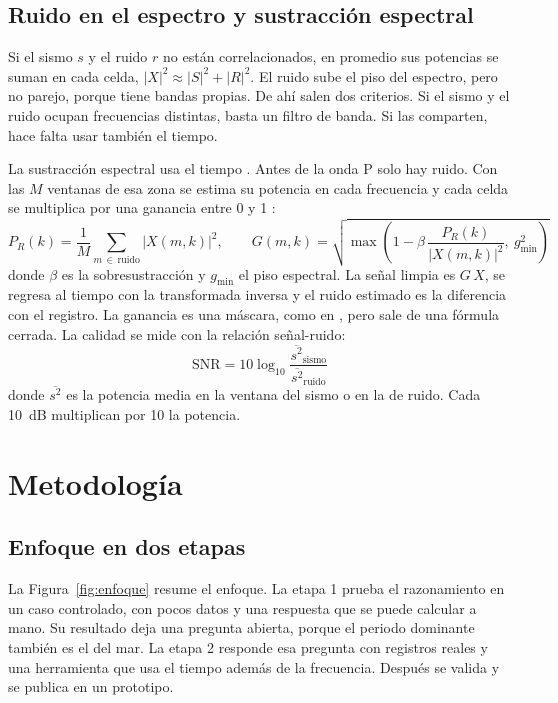 \documentclass[11pt,letterpaper]{article}
\begin{document}
\subsection{Ruido en el espectro y sustracción espectral}
Si el sismo $s$ y el ruido $r$ no están correlacionados, en promedio sus potencias se suman en cada celda, $|X|^2 \approx |S|^2 + |R|^2$. El ruido sube el piso del espectro, pero no parejo, porque tiene bandas propias. De ahí salen dos criterios. Si el sismo y el ruido ocupan frecuencias distintas, basta un filtro de banda. Si las comparten, hace falta usar también el tiempo.

La sustracción espectral usa el tiempo \parencite{boll1979}. Antes de la onda P solo hay ruido. Con las $M$ ventanas de esa zona se estima su potencia en cada frecuencia y cada celda se multiplica por una ganancia entre 0 y 1 \parencite{berouti1979}:
\begin{equation}
P_R(k) = \frac{1}{M}\sum_{m\,\in\,\text{ruido}} |X(m,k)|^2, \qquad G(m,k) = \sqrt{\max\!\left(1 - \beta\,\frac{P_R(k)}{|X(m,k)|^2},\ g_{\min}^2\right)}
\label{eq:ganancia}
\end{equation}
donde $\beta$ es la sobresustracción y $g_{\min}$ el piso espectral. La señal limpia es $G\,X$, se regresa al tiempo con la transformada inversa y el ruido estimado es la diferencia con el registro. La ganancia es una máscara, como en \textcite{zhu2019}, pero sale de una fórmula cerrada. La calidad se mide con la relación señal-ruido:
\begin{equation}
\mathrm{SNR} = 10\log_{10}\frac{\overline{s^2}_{\text{sismo}}}{\overline{s^2}_{\text{ruido}}}
\label{eq:snr}
\end{equation}
donde $\overline{s^2}$ es la potencia media en la ventana del sismo o en la de ruido. Cada \SI{10}{dB} multiplican por 10 la potencia.

\section{Metodología}

\subsection{Enfoque en dos etapas}
La Figura~\ref{fig:enfoque} resume el enfoque. La etapa 1 prueba el razonamiento en un caso controlado, con pocos datos y una respuesta que se puede calcular a mano. Su resultado deja una pregunta abierta, porque el periodo dominante también es el del mar. La etapa 2 responde esa pregunta con registros reales y una herramienta que usa el tiempo además de la frecuencia. Después se valida y se publica en un prototipo.
\end{document}
